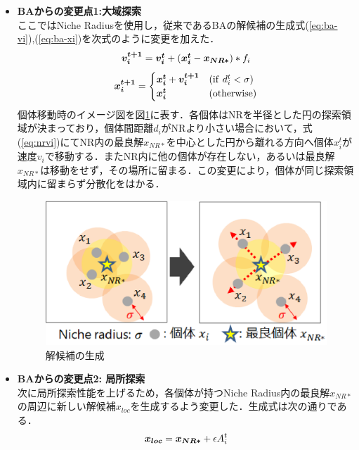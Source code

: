 \documentclass[a4j,11pt]{jarticle}
\begin{document}
\begin{itemize}
\item {\bf BAからの変更点1:大域探索} \\
ここではNiche Radiusを使用し，従来であるBAの解候補の生成式(\ref{eq:ba-vi}),(\ref{eq:ba-xi})を次式のように変更を加えた．
\begin{equation}
\label{eq:nrvi}
\mbox{\boldmath $v_i^{t+1}$}=\mbox{\boldmath $v_i^t$}+(\mbox{\boldmath $x_i^t$}-\mbox{\boldmath $x_{NR*}$})*f_i
\end{equation}
\begin{equation}
\label{eq:nrxi}
\mbox{\boldmath $x_i^{t+1}$}= \begin{cases}
\mbox{\boldmath $x_i^t$}+\mbox{\boldmath $v_i^{t+1}$} & ({\rm if} \ d_i^t < \sigma) \\
\mbox{\boldmath $x_i^t$} & ({\rm otherwise})
\end{cases}
\end{equation}
個体移動時のイメージ図を図\ref{fig:nr}に表す．各個体はNRを半径とした円の探索領域が決まっており，個体間距離${d_i}$がNRより小さい場合において，式(\ref{eq:nrvi})にてNR内の最良解${x_{NR*}}$を中心とした円から離れる方向へ個体${x_i^t}$が速度${v_i}$で移動する．またNR内に他の個体が存在しない，あるいは最良解$x_{NR*}$は移動をせず，その場所に留まる．この変更により，個体が同じ探索領域内に留まらず分散化をはかる．
\begin{figure}[h]
  \centering
  \includegraphics[width=0.7\linewidth]{eps/nr.eps}
  \caption{解候補の生成}
  \label{fig:nr}
\end{figure}

\item {\bf BAからの変更点2: 局所探索} \\
次に局所探索性能を上げるため，各個体が持つNiche Radius内の最良解${x_{NR*}}$の周辺に新しい解候補${x_{loc}}$を生成するよう変更した．生成式は次の通りである．
\begin{equation}
\label{eq:nrloc}
\mbox{\boldmath $x_{loc}$}=\mbox{\boldmath $x_{NR*}$} + \epsilon A_i^t
\end{equation}


\end{itemize}
\end{document}
